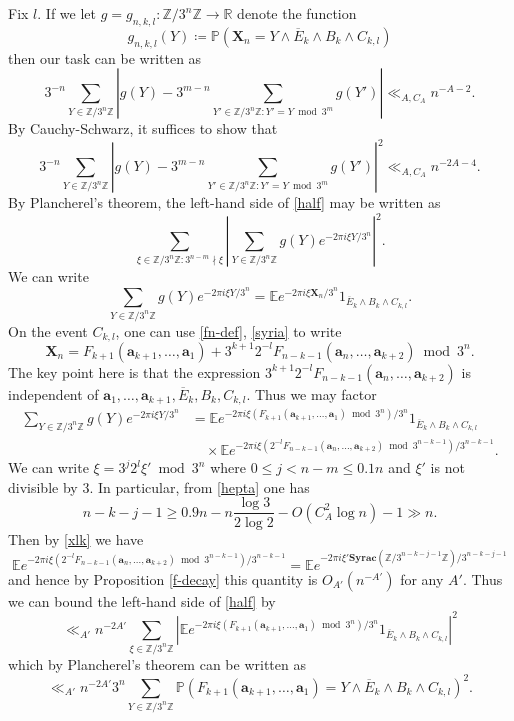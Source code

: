 \documentclass[12pt,a4paper,reqno]{amsart}
\numberwithin{equation}{section}
\theoremstyle{plain}
\theoremstyle{definition}
\renewcommand\P{\mathbb{P}}
\newcommand\E{\mathbb{E}}
\newcommand\R{\mathbb{R}}
\newcommand\Z{\mathbb{Z}}
\renewcommand\a{\mathbf{a}}
\newcommand\X{\mathbf{X}}
\newcommand\Syrac{\mathbf{Syrac}}
\renewcommand{\mod}{\bmod}
\begin{document}
Fix $l$.  If we let $g = g_{n,k,l}\colon \Z/3^n\Z \to \R$ denote the function
$$ g_{n,k,l}(Y) \coloneqq \P( \X_n = Y \wedge \overline{E}_k \wedge B_k \wedge C_{k,l}) $$
then our task can be written as
$$ 
3^{-n} \sum_{Y \in \Z/3^n\Z} \left|g(Y) - 3^{m-n} \sum_{Y' \in \Z/3^n\Z: Y' = Y \mod 3^m} g(Y') \right| \ll_{A,C_A} n^{-A-2}.$$
By Cauchy-Schwarz, it suffices to show that
\begin{equation}\label{half}
3^{-n} \sum_{Y \in \Z/3^n\Z} \left|g(Y) - 3^{m-n} \sum_{Y' \in \Z/3^n\Z: Y' = Y \mod 3^m} g(Y') \right|^2 \ll_{A,C_A} n^{-2A-4}.
\end{equation}
By Plancherel's theorem, the left-hand side of \eqref{half} may be written as
$$ \sum_{\xi \in \Z/3^n\Z: 3^{n-m} \nmid \xi} \left| \sum_{Y \in \Z/3^n\Z} g(Y) e^{-2\pi i \xi Y / 3^n} \right|^2.$$
We can write
$$ \sum_{Y \in \Z/3^n\Z} g(Y) e^{-2\pi i \xi Y / 3^n}  = \E e^{-2\pi i \xi \X_n / 3^n} 1_{\overline{E}_k \wedge B_k \wedge C_{k,l}}.$$ 
On the event $C_{k,l}$, one can use \eqref{fn-def}, \eqref{syria} to write
$$ \X_n = F_{k+1}(\a_{k+1},\dots,\a_1) + 3^{k+1} 2^{-l} F_{n-k-1}(\a_n,\dots,\a_{k+2}) \mod 3^n.$$
The key point here is that the expression $3^{k+1} 2^{-l} F_{n-k-1}(\a_n,\dots,\a_{k+2})$ is independent of $\a_1,\dots,\a_{k+1}, \overline{E}_k, B_k, C_{k,l}$.  Thus we may factor
\begin{align*}
 \sum_{Y \in \Z/3^n\Z} g(Y) e^{-2\pi i \xi Y / 3^n}  &= \E e^{-2\pi i \xi (F_{k+1}(\a_{k+1},\dots,\a_1) \mod 3^n) / 3^n} 1_{\overline{E}_k \wedge B_k \wedge C_{k,l}} \\
&\quad \times \E e^{-2\pi i \xi (2^{-l} F_{n-k-1}(\a_n,\dots,\a_{k+2}) \mod 3^{n-k-1}) / 3^{n-k-1}}.
\end{align*}
We can write $\xi = 3^j 2^l \xi' \mod 3^n$ where $0 \leq j < n-m \leq 0.1 n$ and $\xi'$ is not divisible by $3$.  In particular, from \eqref{hepta} one has
$$ n-k-j-1 \geq 0.9 n - n \frac{\log 3}{2 \log 2} - O(C_A^2 \log n) - 1 \gg n.$$
Then by \eqref{xlk} we have
$$ \E e^{-2\pi i \xi (2^{-l} F_{n-k-1}(\a_n,\dots,\a_{k+2}) \mod 3^{n-k-1}) / 3^{n-k-1}} = \E e^{-2\pi i \xi' \Syrac(\Z/3^{n-k-j-1}\Z) / 3^{n-k-j-1}} $$
and hence by Proposition \ref{f-decay} this quantity is $O_{A'}(n^{-A'})$ for any $A'$.  Thus we can bound the left-hand side of \eqref{half} by
$$ \ll_{A'} n^{-2 A'} \sum_{\xi \in \Z/3^n\Z} \left|\E e^{-2\pi i \xi (F_{k+1}(\a_{k+1},\dots,\a_1) \mod 3^n) / 3^n} 1_{\overline{E}_k \wedge B_k \wedge C_{k,l}} \right|^2$$
which by Plancherel's theorem can be written as
$$ \ll_{A'} n^{-2 A'} 3^n \sum_{Y \in \Z/3^n\Z} \P ( F_{k+1}(\a_{k+1},\dots,\a_1) = Y \wedge \overline{E}_k \wedge B_k \wedge C_{k,l} )^2.$$
\end{document}
